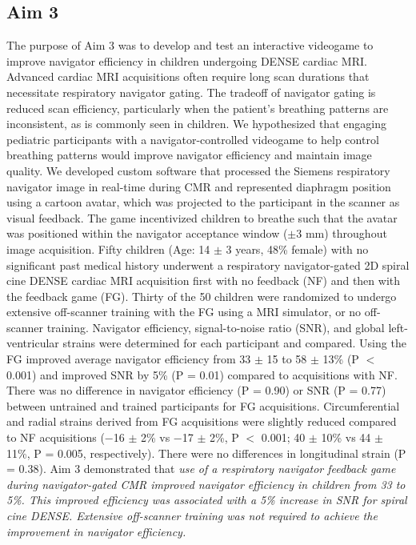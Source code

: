 \subsection{Aim 3}
	The purpose of Aim 3 was to develop and test an interactive videogame to improve navigator efficiency in children undergoing DENSE cardiac MRI. Advanced cardiac MRI acquisitions often require long scan durations that necessitate respiratory navigator gating. The tradeoff of navigator gating is reduced scan efficiency, particularly when the patient's breathing patterns are inconsistent, as is commonly seen in children. We hypothesized that engaging pediatric participants with a navigator-controlled videogame to help control breathing patterns would improve navigator efficiency and maintain image quality. We developed custom software that processed the Siemens respiratory navigator image in real-time during CMR and represented diaphragm position using a cartoon avatar, which was projected to the participant in the scanner as visual feedback. The game incentivized children to breathe such that the avatar was positioned within the navigator acceptance window ($\pm$3 mm) throughout image acquisition. Fifty children (Age: 14 $\pm$ 3 years, 48\% female) with no significant past medical history underwent a respiratory navigator-gated 2D spiral cine DENSE cardiac MRI acquisition first with no feedback (NF) and then with the feedback game (FG). Thirty of the 50 children were randomized to undergo extensive off-scanner training with the FG using a MRI simulator, or no off-scanner training. Navigator efficiency, signal-to-noise ratio (SNR), and global left-ventricular strains were determined for each participant and compared. Using the FG improved average navigator efficiency from 33 $\pm$ 15 to 58 $\pm$ 13\% (P $<$ 0.001) and improved SNR by 5\% (P = 0.01) compared to acquisitions with NF. There was no difference in navigator efficiency (P = 0.90) or SNR (P = 0.77) between untrained and trained participants for FG acquisitions. Circumferential and radial strains derived from FG acquisitions were slightly reduced compared to NF acquisitions (−16 $\pm$ 2\% vs −17 $\pm$ 2\%, P $<$ 0.001; 40 $\pm$ 10\% vs 44 $\pm$ 11\%, P = 0.005, respectively). There were no differences in longitudinal strain (P = 0.38). Aim 3 demonstrated that \textit{use of a respiratory navigator feedback game during navigator-gated CMR improved navigator efficiency in children from 33 to 5\%. This improved efficiency was associated with a 5\% increase in SNR for spiral cine DENSE. Extensive off-scanner training was not required to achieve the improvement in navigator efficiency.}

